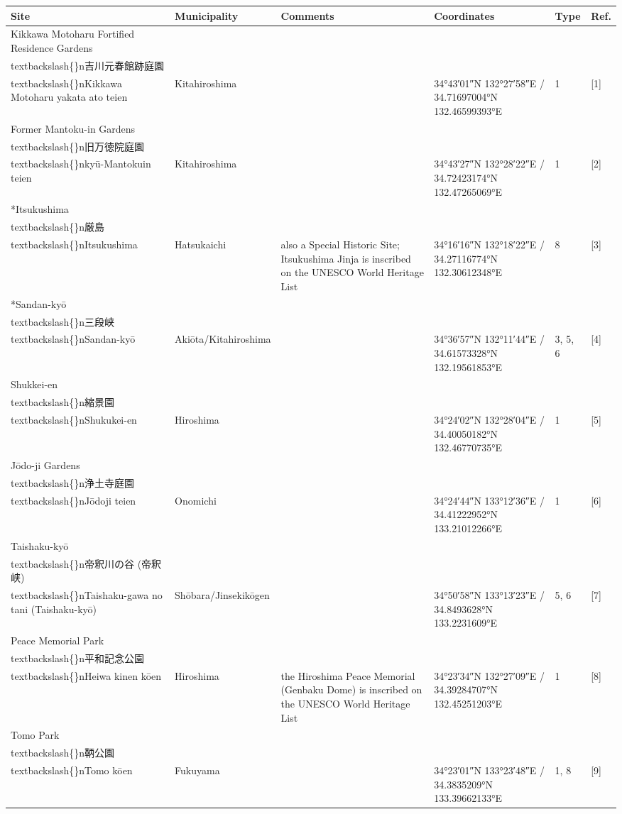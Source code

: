 \documentclass{article}
\begin{document}
\begin{tabular}{llllll}
\toprule
Site & Municipality & Comments & Coordinates & Type & Ref. \\
\midrule
Kikkawa Motoharu Fortified Residence Gardens\\textbackslash\{\}n吉川元春館跡庭園\\textbackslash\{\}nKikkawa Motoharu yakata ato teien & Kitahiroshima &  & 34°43′01″N 132°27′58″E﻿ / ﻿34.71697004°N 132.46599393°E & 1 & [1] \\
Former Mantoku-in Gardens\\textbackslash\{\}n旧万徳院庭園\\textbackslash\{\}nkyū-Mantokuin teien & Kitahiroshima &  & 34°43′27″N 132°28′22″E﻿ / ﻿34.72423174°N 132.47265069°E & 1 & [2] \\
*Itsukushima\\textbackslash\{\}n厳島\\textbackslash\{\}nItsukushima & Hatsukaichi & also a Special Historic Site; Itsukushima Jinja is inscribed on the UNESCO World Heritage List & 34°16′16″N 132°18′22″E﻿ / ﻿34.27116774°N 132.30612348°E & 8 & [3] \\
*Sandan-kyō\\textbackslash\{\}n三段峡\\textbackslash\{\}nSandan-kyō & Akiōta/Kitahiroshima &  & 34°36′57″N 132°11′44″E﻿ / ﻿34.61573328°N 132.19561853°E & 3, 5, 6 & [4] \\
Shukkei-en\\textbackslash\{\}n縮景園\\textbackslash\{\}nShukukei-en & Hiroshima &  & 34°24′02″N 132°28′04″E﻿ / ﻿34.40050182°N 132.46770735°E & 1 & [5] \\
Jōdo-ji Gardens\\textbackslash\{\}n浄土寺庭園\\textbackslash\{\}nJōdoji teien & Onomichi &  & 34°24′44″N 133°12′36″E﻿ / ﻿34.41222952°N 133.21012266°E & 1 & [6] \\
Taishaku-kyō\\textbackslash\{\}n帝釈川の谷 (帝釈峡)\\textbackslash\{\}nTaishaku-gawa no tani (Taishaku-kyō) & Shōbara/Jinsekikōgen &  & 34°50′58″N 133°13′23″E﻿ / ﻿34.8493628°N 133.2231609°E & 5, 6 & [7] \\
Peace Memorial Park\\textbackslash\{\}n平和記念公園\\textbackslash\{\}nHeiwa kinen kōen & Hiroshima & the Hiroshima Peace Memorial (Genbaku Dome) is inscribed on the UNESCO World Heritage List & 34°23′34″N 132°27′09″E﻿ / ﻿34.39284707°N 132.45251203°E & 1 & [8] \\
Tomo Park\\textbackslash\{\}n鞆公園\\textbackslash\{\}nTomo kōen & Fukuyama &  & 34°23′01″N 133°23′48″E﻿ / ﻿34.3835209°N 133.39662133°E & 1, 8 & [9] \\
\bottomrule
\end{tabular}
\end{document}
